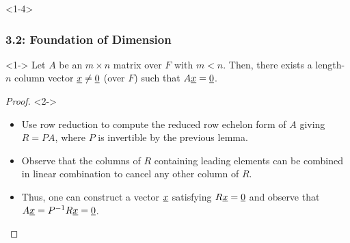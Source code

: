 \documentclass[10pt,english,aspectratio=169]{beamer}
\begin{document}
\begin{frame}<1-4> \frametitle{3.2: Foundation of Dimension}

\begin{lemma}<1->
Let $A$ be an $m \times n$ matrix over $F$ with $m<n$.
Then, there exists a length-$n$ column vector $\underline{x} \neq \underline{0}$ (over $F$) such that $A \underline{x} = \underline{0}$.
\end{lemma}

\begin{proof}<2->
\begin{itemize}
\item<2-> Use row reduction to compute the reduced row echelon form of $A$ giving $R=PA$, where $P$ is invertible by the previous lemma.

\item<3-> Observe that the columns of $R$ containing leading elements can be combined in linear combination to cancel any other column of $R$.

\item<4-> Thus, one can construct a vector $\underline{x}$ satisfying $R\underline{x}=\underline{0}$ and observe that $A \underline{x} = P^{-1} R \underline{x} = \underline{0}$. \hfill \qedhere
\end{itemize}
\end{proof}

\vspace{2mm}




\end{frame}
\end{document}
